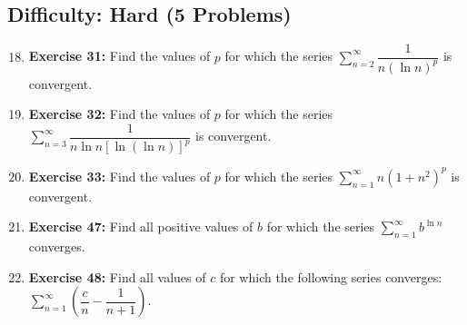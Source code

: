 \documentclass{article}
\begin{document}
\subsection*{Difficulty: Hard (5 Problems)}
\begin{enumerate}
    \setcounter{enumi}{17} %
    \item \textbf{Exercise 31:} Find the values of $p$ for which the series $\sum_{n=2}^{\infty} \dfrac{1}{n(\ln n)^p}$ is convergent.
    \item \textbf{Exercise 32:} Find the values of $p$ for which the series $\sum_{n=3}^{\infty} \dfrac{1}{n \ln n [\ln(\ln n)]^p}$ is convergent.
    \item \textbf{Exercise 33:} Find the values of $p$ for which the series $\sum_{n=1}^{\infty} n (1+n^2)^p$ is convergent.
    \item \textbf{Exercise 47:} Find all positive values of $b$ for which the series $\sum_{n=1}^{\infty} b^{\ln n}$ converges.
    \item \textbf{Exercise 48:} Find all values of $c$ for which the following series converges: $\sum_{n=1}^{\infty} (\dfrac{c}{n} - \dfrac{1}{n+1})$.
\end{enumerate}
\end{document}

